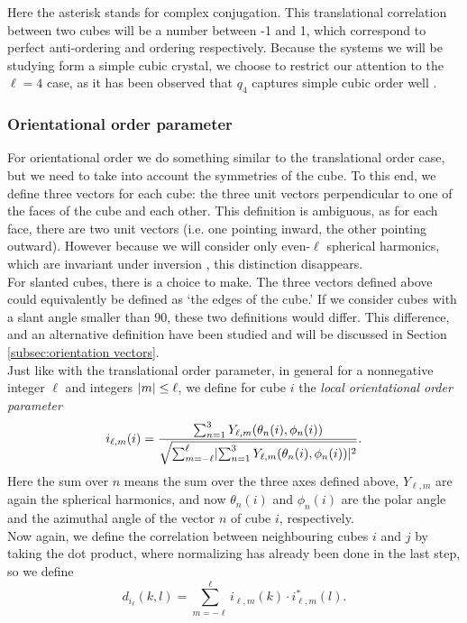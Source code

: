 \documentclass[thesis]{subfiles}
\begin{document}
Here the asterisk stands for complex conjugation. This translational correlation between two cubes will be a number between -1 and 1, which correspond to perfect anti-ordering and ordering respectively. Because the systems we will be studying form a simple cubic crystal, we choose to restrict our attention to the $\ell = 4$ case, as it has been observed that $q_4$ captures simple cubic order well \cite{steinhardt1983bond,mickel2013shortcomings}.

\subsubsection{Orientational order parameter} \label{subsubsec:orient order param}

For orientational order we do something similar to the translational order case, but we need to take into account the symmetries of the cube. To this end, we define three vectors for each cube: the three unit vectors perpendicular to one of the faces of the cube and each other. This definition is ambiguous, as for each face, there are two unit vectors (i.e. one pointing inward, the other pointing outward). However because we will consider only even-$\ell$ spherical harmonics, which are invariant under inversion \cite{steinhardt1983bond}, this distinction disappears.\\
For slanted cubes, there is a choice to make. The three vectors defined above could equivalently be defined as `the edges of the cube.' If we consider cubes with a slant angle smaller than 90\degr, these two definitions would differ. This difference, and an alternative definition have been studied and will be discussed in Section \ref{subsec:orientation vectors}.
\\
Just like with the translational order parameter, in general for a nonnegative integer $\ell$ and integers $ \lvert m\rvert \leq \ell$, we define for cube $i$ the \emph{local orientational order parameter} \cite{escobedo2016effect}
\begin{equation}
i_{\ell, m}(i) = \frac{\sum_{n = 1}^3 Y_{\ell, m}(\theta_n(i), \phi_n(i))}{\sqrt{\sum_{m = -\ell}^\ell \lvert\sum_{n = 1}^3 Y_{\ell, m}(\theta_n(i), \phi_n(i))\rvert^2}}.
\end{equation}
Here the sum over $n$ means the sum over the three axes defined above, $Y_{\ell, m}$ are again the spherical harmonics, and now $\theta_n(i)$ and $\phi_n(i)$ are the polar angle and the azimuthal angle of the vector $n$ of cube $i$, respectively.\\
Now again, we define the correlation between neighbouring cubes $i$ and $j$ by taking the dot product, where normalizing has already been done in the last step, so we define \cite{sharma2018disorder}
\begin{equation}
d_{i_\ell}(k,l) = \sum_{m = -\ell}^\ell i_{\ell, m}(k) \cdot i^*_{\ell, m}(l).
\end{equation}
\end{document}
